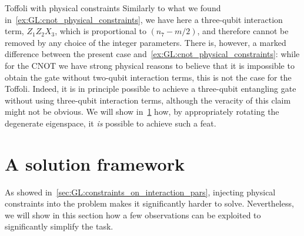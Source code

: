 \begin{examplebox}[label={ex:GL:toffoli_physical_constraints}]{Toffoli with physical constraints}
Similarly to what we found in~\cref{ex:GL:cnot_physical_constraints}, we have here a three-qubit interaction term, $Z_1 Z_2 X_3$, which is proportional to $(n_7 - m/2)$, and therefore cannot be removed by any choice of the integer parameters.
There is, however, a marked difference between the present case and~\cref{ex:GL:cnot_physical_constraints}: while for the CNOT we have strong physical reasons to believe that it is impossible to obtain the gate without two-qubit interaction terms, this is not the case for the Toffoli.
Indeed, it is in principle possible to achieve a three-qubit entangling gate without using three-qubit interaction terms, although the veracity of this claim might not be obvious.
We will show in~\cref{sec:GL:solution_framework} how, by appropriately rotating the degenerate eigenspace, it \textit{is} possible to achieve such a feat.
\end{examplebox}

\section{A solution framework}
\label{sec:GL:solution_framework}

As showed in~\cref{sec:GL:constraints_on_interaction_pars}, injecting physical constraints into the problem makes it significantly harder to solve.
Nevertheless, we will show in this section how a few observations can be exploited to significantly simplify the task.


